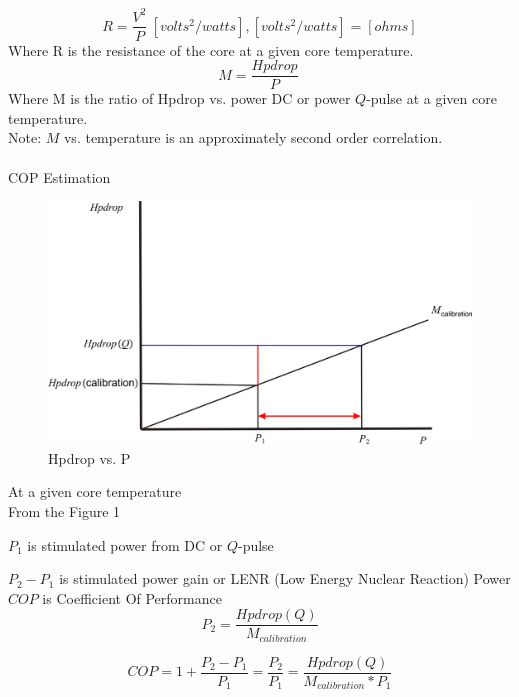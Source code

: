 \documentclass{article}
\begin{document}
\begin{equation}
R=\frac{V^{2}}{P}\ [volts^{2}/watts], [volts^{2}/watts]=[ohms]\label{3}%
\end{equation}
%
Where R is the resistance of the core at a given core temperature.\\
\begin{equation}
M=\frac{Hpdrop}{P}\ \label{4}%
\end{equation}
%
Where M is the ratio of Hpdrop vs. power DC or power $Q$-pulse at a given core temperature. \\
Note:
$M$ vs. temperature is an approximately second order correlation.\\
\\
COP Estimation\\
\begin{figure}
[h]
\begin{center}
\includegraphics[scale=0.5]{jin2.JPG} 
\caption{Hpdrop vs. P}%
\end{center}
\end{figure}

At a given core temperature\\

From the Figure 1

$P_{1}$ is stimulated power from DC or $Q$-pulse

$P_{2}-P_{1}$ is stimulated power gain or LENR (Low Energy Nuclear Reaction) Power \\

$COP$ is Coefficient Of Performance\\
\begin{equation}
P_{2} = \frac{Hpdrop(Q)}{M_{calibration}}
\end{equation}

\begin{equation}
COP=1+\frac{P_{2}-P_{1}}{P_{1}}=\frac{P_{2}}{P_{1}}=\frac{Hpdrop(Q)}{M_{calibration}*P_{1}} \label{4}%
\end{equation}
\end{document}
